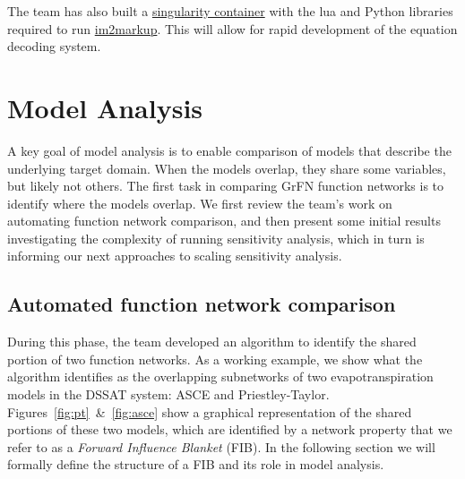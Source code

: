 \documentclass[article, 12pt, oneside]{memoir}
\begin{document}
The team has also built a
\href{https://www.sylabs.io/guides/3.0/user-guide/}{singularity
container} with the lua and Python libraries required to run
\href{https://github.com/harvardnlp/im2markup}{im2markup}. This will
allow for rapid development of the equation decoding system.


\hypertarget{model-analysis}{%
\section{Model Analysis}\label{model-analysis}}

A key goal of model analysis is to enable comparison of models that
describe the underlying target domain. When the models overlap, they
share some variables, but likely not others. The first task in comparing
GrFN function networks is to identify where the models overlap. We first
review the team's work on automating function network comparison, and
then present some initial results investigating the complexity of
running sensitivity analysis, which in turn is informing our next
approaches to scaling sensitivity analysis.

\hypertarget{automated-function-network-comparison}{%
\subsection{Automated function network
comparison}\label{automated-function-network-comparison}}

During this phase, the team developed an algorithm to identify the
shared portion of two function networks. As a working example, we show
what the algorithm identifies as the overlapping subnetworks of two
evapotranspiration models in the DSSAT system: ASCE and
Priestley-Taylor.  Figures~\ref{fig:pt}~\&~\ref{fig:asce} show a graphical
representation of the shared portions of these two models, which are
identified by a network property that we refer to as a \emph{Forward
Influence Blanket} (FIB). In the following section we will formally
define the structure of a FIB and its role in model analysis.

\end{document}
